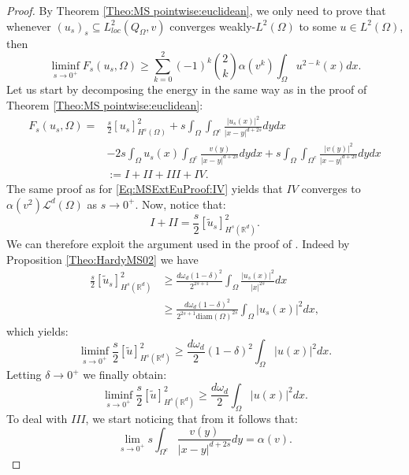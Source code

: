 \documentclass[reqno,11pt]{amsart}
\numberwithin{equation}{section}
\theoremstyle{definition} %
\theoremstyle{plain}
\theoremstyle{definition}
\theoremstyle{remark}
\def\O{\Omega}
\def\io{\int_\Omega}
\def\semin#1#2{ [#1 ]_{#2}}
\def\L{\mathcal{L}}
\def\R{\mathbb{R}}
\newcommand{\abs}[1]{\left|#1\right|}
\begin{document}
\begin{proof}
    By Theorem \ref{Theo:MS pointwise:euclidean}, we only need to prove that whenever $(u_s)_s\subseteq L^2_{loc}(Q_\O,v)$ converges weakly-$L^2(\O)$ to some $u\in L^2(\O)$, then
    \begin{equation}
        \liminf_{s\to0^+}F_s(u_s,\O)\geq \sum_{k=0}^2 (-1)^k\binom{2}{k}\alpha(v^k)\io u^{2-k}(x)dx.
    \end{equation}
    Let us start by decomposing the energy in the same way as in the proof of Theorem \ref{Theo:MS pointwise:euclidean}:
    \begin{align*}
        F_s(u_s,\O)=&\frac{s}{2}\semin{u_s}{H^s(\Omega)}^2
        +s\io\int_{{\Omega^c}} \frac{\abs{u_s(x)}^2}{\abs{x-y}^{d+2s}}dydx\\
        &-2s\io u_s(x)\int_{{\Omega^c}} \frac{v(y)}{\abs{x-y}^{d+2s}}dydx
        +s\io\int_{{\Omega^c}} \frac{\abs{v(y)}^2}{\abs{x-y}^{d+2s}}dydx\\
        &:=I+II+III+IV.     
    \end{align*}
    The same proof as for \eqref{Eq:MSExtEuProof:IV} yields that $IV$ converges to $\alpha(v^2) \L^d(\O)$ as $s\to0^+$. Now, notice that:
    \begin{equation*}
        I+II=\frac{s}{2}[\tilde{u}_s]_{H^s(\R^d)}^2.
    \end{equation*}
    We can therefore exploit the argument used in the proof of  \cite[Theorem 1.2]{CriDLKNP23}. Indeed by Proposition \ref{Theo:HardyMS02} we have
    \begin{align*}
        \frac{s}{2}[\tilde u_s]_{H^s(\R^d)}^2&\geq \frac{d\omega_d(1-\delta)^2}{2^{2s+1}}\int_{\O}\frac{|u_s(x)|^2}{|x|^{2s}}dx\\
        &\geq \frac{d\omega_d(1-\delta)^2}{2^{2s+1}\mathrm{diam}(\O)^{2s}}\int_{\O}|u_s(x)|^2dx,
    \end{align*}
    which yields:
    \begin{equation*}
        \liminf_{s\to0^+}\frac{s}{2}[\tilde u]_{H^s(\R^d)}^2\geq \frac{d \omega_d}{2}(1-\delta)^2\int_{\O}|u(x)|^2dx.
    \end{equation*}
    Letting $\delta\to 0^+$ we finally obtain:
    \begin{equation}
         \liminf_{s\to0^+}\frac{s}{2}[\tilde u]_{H^s(\R^d)}^2\geq \frac{d \omega_d}{2}\int_{\O}|u(x)|^2dx.
    \end{equation}
    To deal with $III$, we start noticing that from  it follows that:
    \begin{equation}
        \label{Eq:Gammaproof:alphavpw}
        \lim_{s\to0^+}s\int_{\O^c}\frac{v(y)}{|x-y|^{d+2s}}dy=\alpha(v).
    \end{equation}
    

\end{proof}
\end{document}
